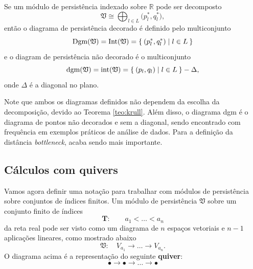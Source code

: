 Se um módulo de persistência indexado sobre $\mathbb{R}$ pode ser decomposto
\begin{equation*}
    \mathfrak{V} \cong \bigoplus_{l \in L} \mathbf(p_l^*, q_l^*),
\end{equation*}
então o diagrama de persistência decorado é definido pelo multiconjunto
\begin{equation*}
    \text{Dgm} (\mathfrak{V}) = \text{Int}(\mathfrak{V}) = \Set{(p_l^*, q_l^*) | l \in L}
\end{equation*}
e o diagram de persistência não decorado é o multiconjunto
\begin{equation*}
    \text{dgm} (\mathfrak{V}) = \text{int}(\mathfrak{V}) = \Set{(p_l, q_l) | l \in L} - \Delta,
\end{equation*}
onde $\Delta$ é a diagonal no plano.

Note que ambos os diagramas definidos não dependem da escolha da decomposição, devido ao Teorema \ref{teo:krull}. 
Além disso, o diagrama dgm é o diagrama de pontos não decorados e sem a diagonal, sendo encontrado com 
frequência em exemplos práticos de análise de dados. Para a definição da distância \textit{bottleneck}, acaba sendo 
mais importante. 

\subsection{Cálculos com quivers}

Vamos agora definir uma notação para trabalhar com módulos de persistência sobre conjuntos de índices 
finitos. 
Um módulo de persistência $\mathfrak{V}$ sobre um conjunto finito de índices
\begin{equation*}
    \mathbf{T} : \qquad a_1 < \dots < a_n 
\end{equation*} 
da reta real pode ser visto como um diagrama de $n$ espaços vetoriais e $n-1$ aplicações lineares, como
mostrado abaixo
\begin{equation*}
    \mathfrak{V} : \quad V_{a_1} \rightarrow \dots \rightarrow V_{a_n}.
\end{equation*}
O diagrama acima é a representação do seguinte \textbf{quiver}:
\begin{equation*}
    \bullet \longrightarrow \bullet \longrightarrow \dots \longrightarrow \bullet
\end{equation*}

